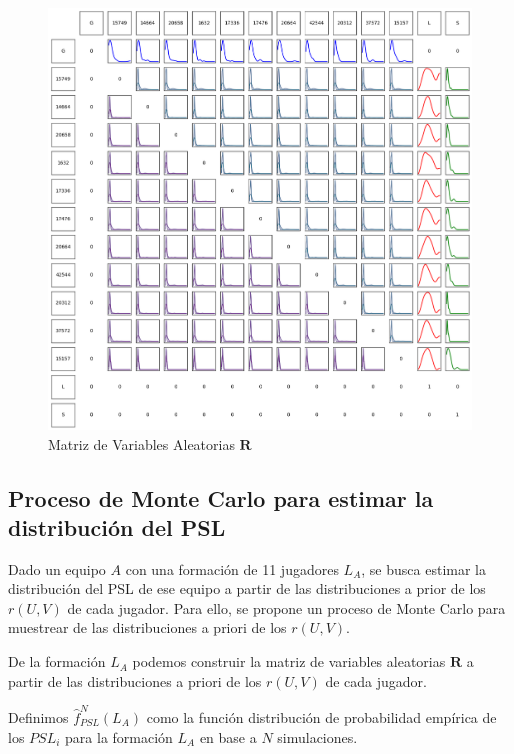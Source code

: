 \documentclass[
  a4paper,
]{article}
\begin{document}
\begin{figure}
  \includegraphics{recursos_pdf/graficos/f9090710-1703-476a-b906-8fddde8ae6d6.png}
    \caption{Matriz de Variables Aleatorias $\mathbf{R}$}
\end{figure}

\hypertarget{proceso-de-monte-carlo-para-estimar-la-distribuciuxf3n-del-psl}{%
\subsection{Proceso de Monte Carlo para estimar la distribución del
PSL}\label{proceso-de-monte-carlo-para-estimar-la-distribuciuxf3n-del-psl}}

Dado un equipo \(A\) con una formación de 11 jugadores \(L_A\), se busca
estimar la distribución del PSL de ese equipo a partir de las
distribuciones a prior de los \(r(U, V)\) de cada jugador. Para ello, se
propone un proceso de Monte Carlo para muestrear de las distribuciones a
priori de los \(r(U, V)\).

De la formación \(L_A\) podemos construir la matriz de variables
aleatorias \(\mathbf{R}\) a partir de las distribuciones a priori de los
\(r(U, V)\) de cada jugador.

Definimos \(\hat{f}^{N}_{PSL}(L_A)\) como la función distribución de
probabilidad empírica de los \(PSL_i\) para la formación \(L_A\) en base
a \(N\) simulaciones.
\end{document}
